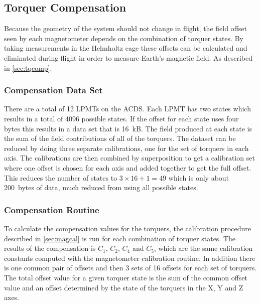 \subsection{Torquer Compensation}

Because the geometry of the system should not change in flight, the field offset seen by each magnetometer depends on the combination of torquer states. By taking measurements in the Helmholtz cage these offsets can be calculated and eliminated during flight in order to measure Earth's magnetic field. As described in \cref{sec:tqcomp}.

\subsubsection{Compensation Data Set}

\label{sec:comp-dat-set}

There are a total of 12 \acp{LPMT} on the \ac{ACDS}. Each \ac{LPMT} has two states which results in a total of 4096 possible states. If the offset for each state uses four bytes this results in a data set that is 16~kB. The field produced at each state is the sum of the field contributions of all of the torquers. The dataset can be reduced by doing three separate calibrations, one for the set of torquers in each axis. The calibrations are then combined by superposition to get a calibration set where one offset is chosen for each axis and added together to get the full offset. This reduces the number of states to $3 \times 16 + 1 = 49$ which is only about 200~bytes of data, much reduced from using all possible states.

\subsubsection{Compensation Routine}

\label{sec:tq-comp}

To calculate the compensation values for the torquers, the calibration procedure described in \cref{sec:magcal} is run for each combination of torquer states. The results of the compensation is $C_1$, $C_2$, $C_4$ and $ C_5$, which are the same calibration constants computed with the magnetometer calibration routine. In addition there is one common pair of offsets and then 3 sets of 16 offsets for each set of torquers. The total offset value for a given torquer state is the sum of the common offset value and an offset determined by the state of the torquers in the X, Y and Z axes.

